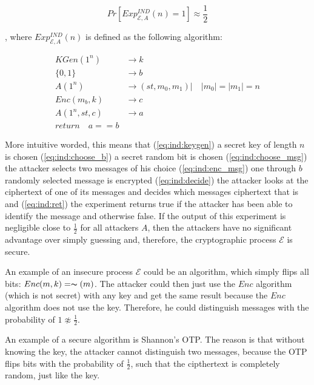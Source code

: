 $$
    Pr[Exp_{\mathcal{E}, A}^{IND}(n) = 1] \approx \frac{1}{2}
$$

, where $Exp_{\mathcal{E}, A}^{IND}(n)$ is defined as the following algorithm:

\begin{align}
    KGen(1^{n})   & \rightarrow k                                       \label{eq:ind:keygen}      \\
    \{0, 1\}      & \rightarrow b             \label{eq:ind:choose_b}                              \\
    A(1^n)        & \rightarrow (st, m_0, m_1) | \quad |m_0| = |m_1| = n \label{eq:ind:choose_msg} \\
    Enc(m_b, k)   & \rightarrow c                          \label{eq:ind:enc_msg}                  \\
    A(1^n, st, c) & \rightarrow   \label{eq:ind:decide}                                  a         \\
    return \quad a == b \label{eq:ind:ret}
\end{align}

More intuitive worded, this means that (\ref{eq:ind:keygen}) a secret key of length $n$ is chosen (\ref{eq:ind:choose_b}) a secret random bit is chosen (\ref{eq:ind:choose_msg}) the attacker selects two messages of his choice (\ref{eq:ind:enc_msg}) one through $b$ randomly selected message is encrypted (\ref{eq:ind:decide}) the attacker looks at the ciphertext of one of its messages and decides which messages ciphertext that is and (\ref{eq:ind:ret}) the experiment returns true if the attacker has been able to identify the message and otherwise false. If the output of this experiment is negligible close to $\frac{1}{2}$ for all attackers $A$, then the attackers have no significant advantage over simply guessing and, therefore, the cryptographic process $\mathcal{E}$ is secure.

An example of an insecure process $\mathcal{E}$ could be an algorithm, which simply flips all bits: $Enc(m, k) = \thicksim(m)$. The attacker could then just use the $Enc$ algorithm (which is not secret) with any key and get the same result because the $Enc$ algorithm does not use the key. Therefore, he could distinguish messages with the probability of $1 \not\approx \frac{1}{2}$.

An example of a secure algorithm is Shannon's OTP. The reason is that without knowing the key, the attacker cannot distinguish two messages, because the OTP flips bits with the probability of $\frac{1}{2}$, such that the cipthertext is completely random, just like the key.


